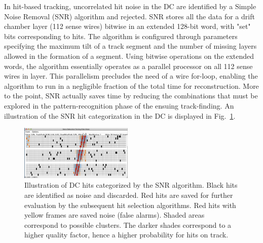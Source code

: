 In hit-based
tracking, uncorrelated hit noise in the DC are identified by a Simple Noise
Removal (SNR) algorithm and rejected. SNR stores all the data for a drift chamber layer (112 sense wires)
bitwise in an extended 128-bit word, with "set" bits corresponding to hits. The algorithm is configured
through parameters specifying the maximum tilt of a track segment and the number of missing layers
allowed in the formation of a segment. Using bitwise operations on the extended words, the algorithm
essentially operates as a parallel processor on all 112 sense wires in layer. This parallelism precludes the
need of a wire for-loop, enabling the algorithm to run in a negligible fraction of the total time for
reconstruction. More to the point, SNR actually saves time by reducing the combinations that must be
explored in the pattern-recognition phase of the ensuing track-finding.
An illustration of the SNR hit categorization in the DC is displayed in Fig.~\ref{fig:snr}.
\begin{figure}
\centering
\includegraphics[width=0.48\textwidth]{pics/dcPattern9.png}
\caption{
Illustration of DC hits categorized by the SNR algorithm.  
Black hits are identified as noise and discarded.
Red hits are saved for further evaluation by the subsequent hit selection algorithms. 
Red hits with yellow frames are saved noise (false alarms).  Shaded areas correspond to 
possible clusters.  The darker shades correspond to a higher quality factor, hence a higher probability for hits on track.
}
\label{fig:snr}
\end{figure}

